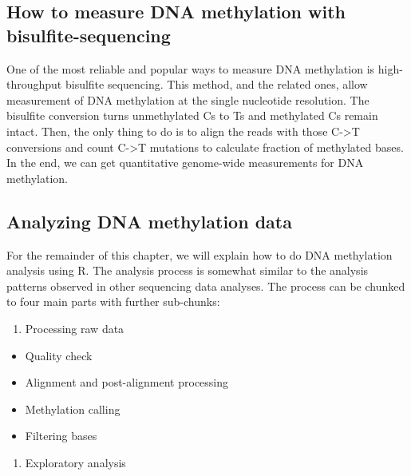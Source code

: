 \documentclass[12pt,]{krantz}
\providecommand{\tightlist}{%
  \setlength{\itemsep}{0pt}\setlength{\parskip}{0pt}}
\begin{document}
\hypertarget{how-to-measure-dna-methylation-with-bisulfite-sequencing}{%
\subsection{How to measure DNA methylation with bisulfite-sequencing}\label{how-to-measure-dna-methylation-with-bisulfite-sequencing}}

One of the most reliable and popular ways to measure DNA methylation is high-throughput bisulfite sequencing. This method, and the related ones, allow measurement of DNA methylation at the single nucleotide resolution. The bisulfite conversion turns unmethylated Cs to Ts and methylated Cs remain intact. Then, the only thing to do is to align the reads with those C-\textgreater{}T conversions and count C-\textgreater{}T mutations to calculate fraction of methylated bases. In the end, we can get quantitative genome-wide measurements for DNA methylation.

\hypertarget{analyzing-dna-methylation-data}{%
\subsection{Analyzing DNA methylation data}\label{analyzing-dna-methylation-data}}

For the remainder of this chapter, we will explain how to do DNA methylation analysis using R. The analysis process is somewhat similar to the analysis patterns observed in other sequencing data analyses. The process can be chunked to four main parts with further sub-chunks:

\begin{enumerate}
\def\labelenumi{\arabic{enumi}.}
\tightlist
\item
  Processing raw data
\end{enumerate}

\begin{itemize}
\tightlist
\item
  Quality check
\item
  Alignment and post-alignment processing
\item
  Methylation calling
\item
  Filtering bases
\end{itemize}

\begin{enumerate}
\def\labelenumi{\arabic{enumi}.}
\setcounter{enumi}{1}
\tightlist
\item
  Exploratory analysis
\end{enumerate}
\end{document}
